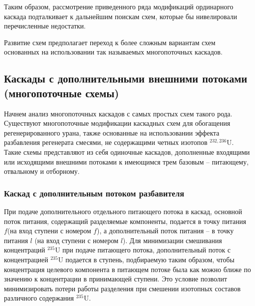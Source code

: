 Таким образом, рассмотрение приведенного ряда модификаций ординарного каскада подталкивает к дальнейшим поискам схем, которые бы нивелировали перечисленные недостатки.

Развитие схем предполагает переход к более сложным вариантам схем основанных на использовании так называемых многопоточных каскадов.

\subsection{Каскады с дополнительными внешними потоками (многопоточные схемы)}

Начнем анализ многопоточных каскадов с самых простых схем такого рода.
Существуют многопоточные модификации каскадных схем для обогащения регенерированного урана, также основанные на использовании эффекта разбавления регенерата смесями, не содержащими четных изотопов $^{232,236}$U. Такие схемы представляют из себя одиночные каскадов, дополненные входящими или исходящими внешними потоками к имеющимся трем базовым -- питающему, отвальному и отборному.

\subsubsection{Каскад с дополнительным потоком разбавителя}

При подаче дополнительного отдельного питающего потока в каскад, основной поток питания, содержащий разделяемые компоненты, подается в точку питания $f$(на вход ступени с номером $f$), а дополнительный поток питания -- в точку питания $l$ (на вход ступени с номером $l$). Для минимизации смешивания концентраций $^{235}$U при подаче питающего потока, дополнительный поток с концентрацией $^{235}$U подается в ступень, подбираемую таким образом, чтобы концентрация целевого компонента в питающем потоке была как можно ближе по значению к концентрации в принимающей ступени. Это условие позволит минимизировать потери работы разделения при смешении изотопных составов различного содержания $^{235}$U.

